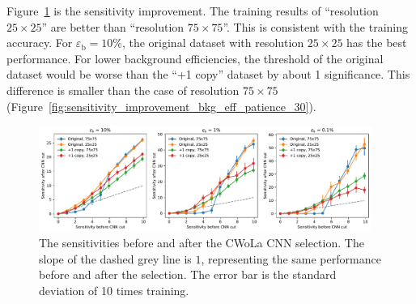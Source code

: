 \documentclass[12pt]{article}
\begin{document}
        Figure~\ref{fig:sensitivity_improvement_bkg_eff_resolution_25} is the sensitivity improvement. The training results of ``resolution $25\times 25$'' are better than ``resolution $75\times 75$''. This is consistent with the training accuracy. For $\varepsilon_{\text{b}} = 10 \%$, the original dataset with resolution $25\times 25$ has the best performance. For lower background efficiencies, the threshold of the original dataset would be worse than the ``+1 copy'' dataset by about 1 significance. This difference is smaller than the case of resolution $75\times 75$ (Figure~\ref{fig:sensitivity_improvement_bkg_eff_patience_30}).
        \begin{figure}[htpb]
            \centering
            \includegraphics[width=0.97\textwidth]{HVmodel_sensitivity_improvement_bkg_eff_origin_copy_1_res_75_25.pdf}
            \caption{The sensitivities before and after the CWoLa CNN selection. The slope of the dashed grey line is $1$, representing the same performance before and after the selection. The error bar is the standard deviation of 10 times training.}
            \label{fig:sensitivity_improvement_bkg_eff_resolution_25}
        \end{figure}
\end{document}
